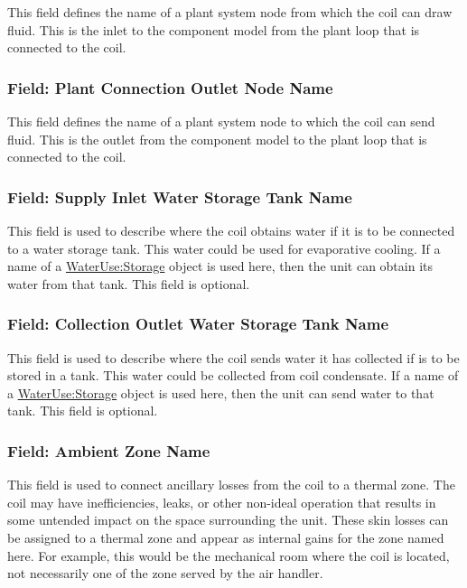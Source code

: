 This field defines the name of a plant system node from which the coil can draw fluid. This is the inlet to the component model from the plant loop that is connected to the coil.

\subsubsection{Field: Plant Connection Outlet Node Name}\label{field-plant-connection-outlet-node-name}

This field defines the name of a plant system node to which the coil can send fluid. This is the outlet from the component model to the plant loop that is connected to the coil.

\subsubsection{Field: Supply Inlet Water Storage Tank Name}\label{field-supply-inlet-water-storage-tank-name-2}

This field is used to describe where the coil obtains water if it is to be connected to a water storage tank. This water could be used for evaporative cooling. If a name of a \hyperref[waterusestorage]{WaterUse:Storage} object is used here, then the unit can obtain its water from that tank. This field is optional.

\subsubsection{Field: Collection Outlet Water Storage Tank Name}\label{field-collection-outlet-water-storage-tank-name-2}

This field is used to describe where the coil sends water it has collected if is to be stored in a tank. This water could be collected from coil condensate. If a name of a \hyperref[waterusestorage]{WaterUse:Storage} object is used here, then the unit can send water to that tank. This field is optional.

\subsubsection{Field: Ambient Zone Name}\label{field-ambient-zone-name-2}

This field is used to connect ancillary losses from the coil to a thermal zone. The coil may have inefficiencies, leaks, or other non-ideal operation that results in some untended impact on the space surrounding the unit. These skin losses can be assigned to a thermal zone and appear as internal gains for the zone named here. For example, this would be the mechanical room where the coil is located, not necessarily one of the zone served by the air handler.

